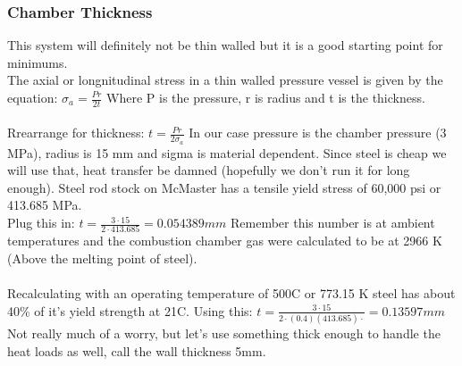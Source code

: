 \documentclass[12pt, letter paper]{article}
\begin{document}
			\subsubsection{Chamber Thickness}
				This system will definitely not be thin walled but it is a good starting point for minimums. \\
				The axial or longnitudinal stress in a thin walled pressure vessel is given by the equation: 
				$ \sigma_a = \frac{Pr}{2t} $ Where P is the pressure, r is radius and t is the thickness. \\ \\
				Rrearrange for thickness: $ t = \frac{Pr}{2\sigma_a} $ In our case pressure is the chamber pressure (3 MPa), radius is 15 mm and sigma is material dependent. 
				Since steel is cheap we will use that, heat transfer be damned (hopefully we don't run it for long enough). Steel rod stock on McMaster has a tensile yield stress of 60,000 psi or 413.685 MPa. \\
				Plug this in:  $ t = \frac{3 \cdot 15}{2 \cdot 413.685} = 0.054389 mm $ 
				Remember this number is at ambient temperatures and the combustion chamber gas were calculated to be at 2966 K (Above the melting point of steel). \\ \\
				Recalculating with an operating temperature of 500{\degree}C or 773.15 K steel has about 40\% of it's yield strength at 21C. Using this: $ t = \frac{3 \cdot 15}{2 \cdot(0.4) (413.685) \cdot} = 0.13597 mm $ \\
				Not really much of a worry, but let's use something thick enough to handle the heat loads as well, call the wall thickness 5mm.
			

			
		
\end{document}
